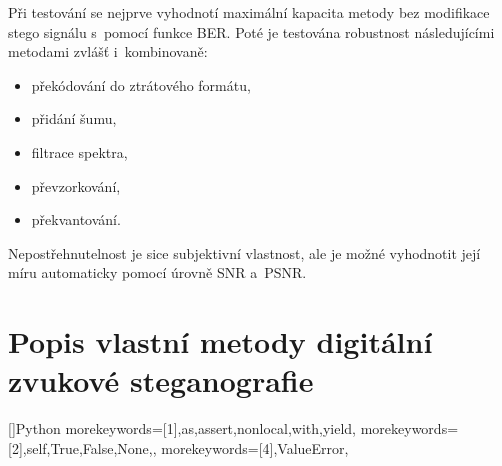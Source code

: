 Při testování se nejprve vyhodnotí maximální kapacita metody bez modifikace
stego signálu s~pomocí funkce BER. Poté je testována robustnost následujícími
metodami zvlášť i~kombinovaně:

\begin{itemize}
    \item překódování do ztrátového formátu,
    \item přidání šumu,
    \item filtrace spektra,
    \item převzorkování,
    \item překvantování.
\end{itemize}

Nepostřehnutelnost je sice subjektivní vlastnost, ale je možné vyhodnotit její
míru automaticky pomocí úrovně SNR a~PSNR.

\section{Popis vlastní metody digitální zvukové steganografie}
\label{sec:own-method-proposal}


\blindtext

\blindtext


%
\lstset{style=mystyle}%
[]{Python}{%
    morekeywords=[1]{,as,assert,nonlocal,with,yield},
    morekeywords=[2]{,self,True,False,None,},
    morekeywords=[4]{,ValueError},
}%


